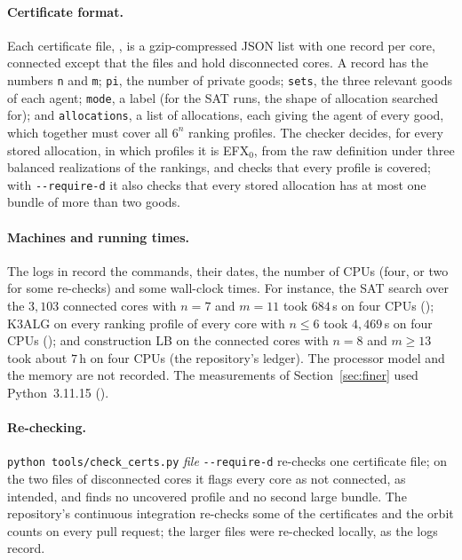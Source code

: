 \documentclass[runningheads,11pt]{llncs}
\newcommand{\efxz}{\texorpdfstring{\mbox{EFX$_0$}}{EFX0}}
\begin{document}
\paragraph{Certificate format.} Each certificate file, , is a gzip-compressed JSON list with one record per core, connected except that the files  and  hold disconnected cores. A record has the numbers \texttt{n} and \texttt{m}; \texttt{pi}, the number of private goods; \texttt{sets}, the three relevant goods of each agent; \texttt{mode}, a label (for the SAT runs, the shape of allocation searched for); and \texttt{allocations}, a list of allocations, each giving the agent of every good, which together must cover all $6^n$ ranking profiles. The checker decides, for every stored allocation, in which profiles it is \efxz{}, from the raw definition under three balanced realizations of the rankings, and checks that every profile is covered; with \texttt{-{}-require-d} it also checks that every stored allocation has at most one bundle of more than two goods.

\paragraph{Machines and running times.} The logs in  record the commands, their dates, the number of CPUs (four, or two for some re-checks) and some wall-clock times. For instance, the SAT search over the $3{,}103$ connected cores with $n=7$ and $m=11$ took $684$\,s on four CPUs (); K3ALG on every ranking profile of every core with $n\le6$ took $4{,}469$\,s on four CPUs (); and construction LB on the connected cores with $n=8$ and $m\ge13$ took about $7$\,h on four CPUs (the repository's ledger). The processor model and the memory are not recorded. The measurements of Section~\ref{sec:finer} used Python~3.11.15 ().

\paragraph{Re-checking.} \texttt{python tools/check\_certs.py} \emph{file} \texttt{-{}-require-d} re-checks one certificate file; on the two files of disconnected cores it flags every core as not connected, as intended, and finds no uncovered profile and no second large bundle. The repository's continuous integration re-checks some of the certificates and the orbit counts on every pull request; the larger files were re-checked locally, as the logs record.
\end{document}
